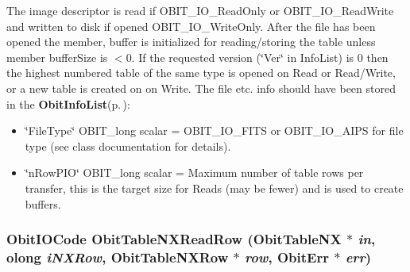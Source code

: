 The image descriptor is read if OBIT\_\-IO\_\-Read\-Only or OBIT\_\-IO\_\-Read\-Write and written to disk if opened OBIT\_\-IO\_\-Write\-Only. After the file has been opened the member, buffer is initialized for reading/storing the table unless member buffer\-Size is $<$0. If the requested version (\char`\"{}Ver\char`\"{} in Info\-List) is 0 then the highest numbered table of the same type is opened on Read or Read/Write, or a new table is created on on Write. The file etc. info should have been stored in the {\bf Obit\-Info\-List}{\rm (p.\,\pageref{structObitInfoList})}: \begin{itemize}
\item \char`\"{}File\-Type\char`\"{} OBIT\_\-long scalar = OBIT\_\-IO\_\-FITS or OBIT\_\-IO\_\-AIPS for file type (see class documentation for details). \item \char`\"{}n\-Row\-PIO\char`\"{} OBIT\_\-long scalar = Maximum number of table rows per transfer, this is the target size for Reads (may be fewer) and is used to create buffers. 
\end{itemize}
\subsubsection{\setlength{\rightskip}{0pt plus 5cm}Obit\-IOCode Obit\-Table\-NXRead\-Row ({\bf Obit\-Table\-NX} $\ast$ {\em in}, {\bf olong} {\em i\-NXRow}, {\bf Obit\-Table\-NXRow} $\ast$ {\em row}, {\bf Obit\-Err} $\ast$ {\em err})}\label{ObitTableNX_8h_a18}


